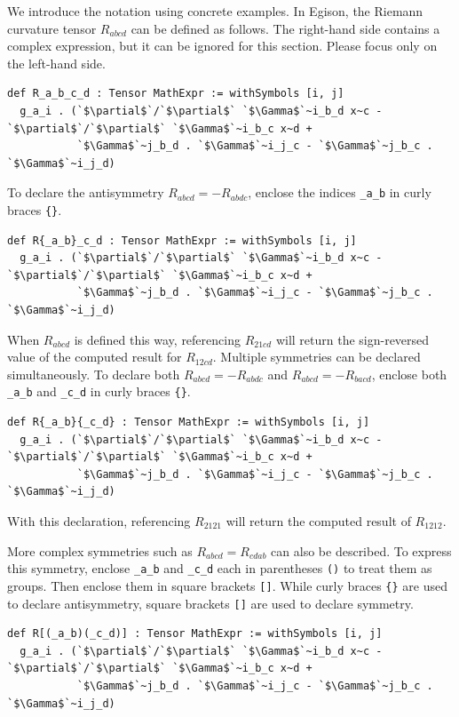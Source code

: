 We introduce the notation using concrete examples.
In Egison, the Riemann curvature tensor $R_{abcd}$ can be defined as follows.
The right-hand side contains a complex expression, but it can be ignored for this section.
Please focus only on the left-hand side.
\begin{lstlisting}[language=egison,numbers=none]
def R_a_b_c_d : Tensor MathExpr := withSymbols [i, j]
  g_a_i . (`$\partial$`/`$\partial$` `$\Gamma$`~i_b_d x~c - `$\partial$`/`$\partial$` `$\Gamma$`~i_b_c x~d +
           `$\Gamma$`~j_b_d . `$\Gamma$`~i_j_c - `$\Gamma$`~j_b_c . `$\Gamma$`~i_j_d)
\end{lstlisting}
To declare the antisymmetry $R_{abcd} = -R_{abdc}$, enclose the indices \lstinline{_a_b} in curly braces \lstinline|{}|.
\begin{lstlisting}[language=egison,numbers=none]
def R{_a_b}_c_d : Tensor MathExpr := withSymbols [i, j]
  g_a_i . (`$\partial$`/`$\partial$` `$\Gamma$`~i_b_d x~c - `$\partial$`/`$\partial$` `$\Gamma$`~i_b_c x~d +
           `$\Gamma$`~j_b_d . `$\Gamma$`~i_j_c - `$\Gamma$`~j_b_c . `$\Gamma$`~i_j_d)
\end{lstlisting}
When $R_{abcd}$ is defined this way, referencing $R_{21cd}$ will return the sign-reversed value of the computed result for $R_{12cd}$.
Multiple symmetries can be declared simultaneously.
To declare both $R_{abcd} = -R_{abdc}$ and $R_{abcd} = -R_{bacd}$, enclose both \lstinline{_a_b} and \lstinline{_c_d} in curly braces \lstinline|{}|.
\begin{lstlisting}[language=egison,numbers=none]
def R{_a_b}{_c_d} : Tensor MathExpr := withSymbols [i, j]
  g_a_i . (`$\partial$`/`$\partial$` `$\Gamma$`~i_b_d x~c - `$\partial$`/`$\partial$` `$\Gamma$`~i_b_c x~d +
           `$\Gamma$`~j_b_d . `$\Gamma$`~i_j_c - `$\Gamma$`~j_b_c . `$\Gamma$`~i_j_d)
\end{lstlisting}
With this declaration, referencing $R_{2121}$ will return the computed result of $R_{1212}$.

More complex symmetries such as $R_{abcd} = R_{cdab}$ can also be described.
To express this symmetry, enclose \lstinline{_a_b} and \lstinline{_c_d} each in parentheses \lstinline{()} to treat them as groups.
Then enclose them in square brackets \lstinline|[]|.
While curly braces \lstinline|{}| are used to declare antisymmetry, square brackets \lstinline|[]| are used to declare symmetry.
\begin{lstlisting}[language=egison,numbers=none]
def R[(_a_b)(_c_d)] : Tensor MathExpr := withSymbols [i, j]
  g_a_i . (`$\partial$`/`$\partial$` `$\Gamma$`~i_b_d x~c - `$\partial$`/`$\partial$` `$\Gamma$`~i_b_c x~d +
           `$\Gamma$`~j_b_d . `$\Gamma$`~i_j_c - `$\Gamma$`~j_b_c . `$\Gamma$`~i_j_d)
\end{lstlisting}


